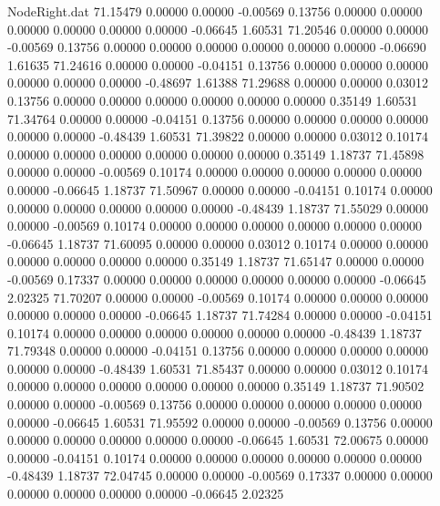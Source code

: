 \begin{filecontents}{NodeRight.dat}
  71.15479    0.00000    0.00000    -0.00569    0.13756    0.00000    0.00000    0.00000    0.00000    0.00000    0.00000   -0.06645    1.60531
  71.20546    0.00000    0.00000    -0.00569    0.13756    0.00000    0.00000    0.00000    0.00000    0.00000    0.00000   -0.06690    1.61635
  71.24616    0.00000    0.00000    -0.04151    0.13756    0.00000    0.00000    0.00000    0.00000    0.00000    0.00000   -0.48697    1.61388
  71.29688    0.00000    0.00000     0.03012    0.13756    0.00000    0.00000    0.00000    0.00000    0.00000    0.00000    0.35149    1.60531
  71.34764    0.00000    0.00000    -0.04151    0.13756    0.00000    0.00000    0.00000    0.00000    0.00000    0.00000   -0.48439    1.60531
  71.39822    0.00000    0.00000     0.03012    0.10174    0.00000    0.00000    0.00000    0.00000    0.00000    0.00000    0.35149    1.18737
  71.45898    0.00000    0.00000    -0.00569    0.10174    0.00000    0.00000    0.00000    0.00000    0.00000    0.00000   -0.06645    1.18737
  71.50967    0.00000    0.00000    -0.04151    0.10174    0.00000    0.00000    0.00000    0.00000    0.00000    0.00000   -0.48439    1.18737
  71.55029    0.00000    0.00000    -0.00569    0.10174    0.00000    0.00000    0.00000    0.00000    0.00000    0.00000   -0.06645    1.18737
  71.60095    0.00000    0.00000     0.03012    0.10174    0.00000    0.00000    0.00000    0.00000    0.00000    0.00000    0.35149    1.18737
  71.65147    0.00000    0.00000    -0.00569    0.17337    0.00000    0.00000    0.00000    0.00000    0.00000    0.00000   -0.06645    2.02325
  71.70207    0.00000    0.00000    -0.00569    0.10174    0.00000    0.00000    0.00000    0.00000    0.00000    0.00000   -0.06645    1.18737
  71.74284    0.00000    0.00000    -0.04151    0.10174    0.00000    0.00000    0.00000    0.00000    0.00000    0.00000   -0.48439    1.18737
  71.79348    0.00000    0.00000    -0.04151    0.13756    0.00000    0.00000    0.00000    0.00000    0.00000    0.00000   -0.48439    1.60531
  71.85437    0.00000    0.00000     0.03012    0.10174    0.00000    0.00000    0.00000    0.00000    0.00000    0.00000    0.35149    1.18737
  71.90502    0.00000    0.00000    -0.00569    0.13756    0.00000    0.00000    0.00000    0.00000    0.00000    0.00000   -0.06645    1.60531
  71.95592    0.00000    0.00000    -0.00569    0.13756    0.00000    0.00000    0.00000    0.00000    0.00000    0.00000   -0.06645    1.60531
  72.00675    0.00000    0.00000    -0.04151    0.10174    0.00000    0.00000    0.00000    0.00000    0.00000    0.00000   -0.48439    1.18737
  72.04745    0.00000    0.00000    -0.00569    0.17337    0.00000    0.00000    0.00000    0.00000    0.00000    0.00000   -0.06645    2.02325

\end{filecontents}
